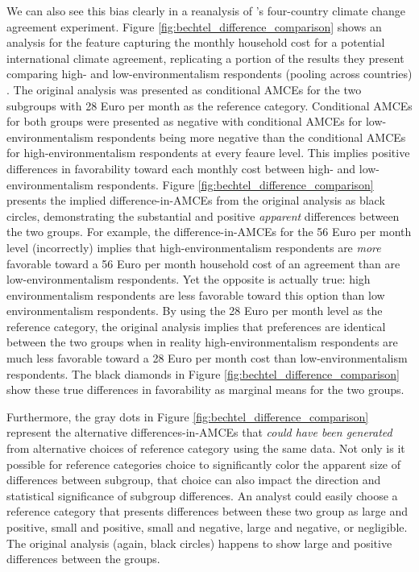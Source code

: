 \documentclass[a4paper,12pt]{article}\usepackage[]{graphicx}\usepackage[]{color}
\begin{document}
We can also see this bias clearly in a reanalysis of \citeauthor{BechtelScheve2013}'s four-country climate change agreement experiment. Figure \ref{fig:bechtel_difference_comparison} shows an analysis for the feature capturing the monthly household cost for a potential international climate agreement, replicating a portion of the results they present comparing high- and low-environmentalism respondents (pooling across countries) \citet[13767 figure 4]{BechtelScheve2013}. The original analysis was presented as conditional AMCEs for the two subgroups with 28 Euro per month as the reference category. Conditional AMCEs for both groups were presented as negative with conditional AMCEs for low-environmentalism respondents being more negative than the conditional AMCEs for high-environmentalism respondents at every feaure level. This implies positive differences in favorability toward each monthly cost between high- and low-environmentalism respondents. Figure \ref{fig:bechtel_difference_comparison} presents the implied difference-in-AMCEs from the original analysis as black circles, demonstrating the substantial and positive \textit{apparent} differences between the two groups. For example, the difference-in-AMCEs for the 56 Euro per month level (incorrectly) implies that high-environmentalism respondents are \textit{more} favorable toward a 56 Euro per month household cost of an agreement than are low-environmentalism respondents. Yet the opposite is actually true: high environmentalism respondents are less favorable toward this option than low environmentalism respondents. By using the 28 Euro per month level as the reference category, the original analysis implies that preferences are identical between the two groups when in reality high-environmentalism respondents are much less favorable toward a 28 Euro per month cost than low-environmentalism respondents. The black diamonds in Figure \ref{fig:bechtel_difference_comparison} show these true differences in favorability as marginal means for the two groups.

Furthermore, the gray dots in Figure \ref{fig:bechtel_difference_comparison} represent the alternative differences-in-AMCEs that \textit{could have been generated} from alternative choices of reference category using the same data. Not only is it possible for reference categories choice to significantly color the apparent size of differences between subgroup, that choice can also impact the direction and statistical significance of subgroup differences. An analyst could easily choose a reference category that presents differences between these two group as large and positive, small and positive, small and negative, large and negative, or negligible. The original analysis (again, black circles) happens to show large and positive differences between the groups.
\end{document}
